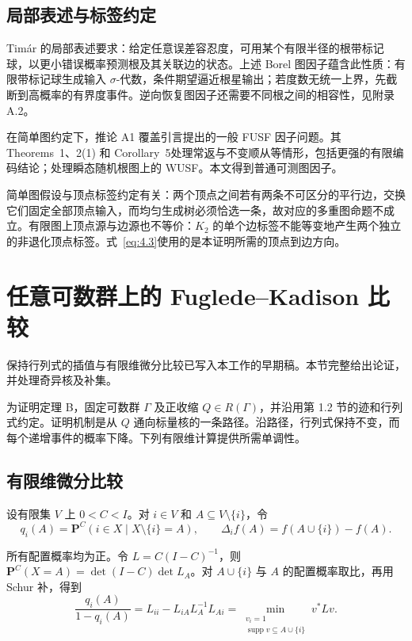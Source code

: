 \documentclass[UTF8,zihao=-4,a4paper]{ctexart}
\numberwithin{equation}{section}
\begin{document}
\subsection{局部表述与标签约定}

Timár 的局部表述要求：给定任意误差容忍度，可用某个有限半径的根带标记球，以更小错误概率预测根及其关联边的状态\cite[\S2]{Tim}。上述 Borel 图因子蕴含此性质：有限带标记球生成输入 $\sigma$-代数，条件期望逼近根星输出；若度数无统一上界，先截断到高概率的有界度事件。逆向恢复图因子还需要不同根之间的相容性，见附录 A.2。

在简单图约定下，推论 A1 覆盖\cite{Tim}引言提出的一般 FUSF 因子问题。其 Theorems~1、2(1) 和 Corollary~5处理常返与不变顺从等情形，包括更强的有限编码结论；\cite[Theorem~1.4]{ARS}处理瞬态随机根图上的 WUSF。本文得到普通可测图因子。

简单图假设与顶点标签约定有关：两个顶点之间若有两条不可区分的平行边，交换它们固定全部顶点输入，而均匀生成树必须恰选一条，故对应的多重图命题不成立。有限图上顶点源与边源也不等价：$K_2$ 的单个边标签不能等变地产生两个独立的非退化顶点标签。式~\eqref{eq:4.3}使用的是本证明所需的顶点到边方向。


\section{任意可数群上的 Fuglede--Kadison 比较}
保持行列式的插值与有限维微分比较已写入本工作的早期稿\cite[第2--3节]{FK26}。本节完整给出论证，并处理奇异核及补集。

为证明定理 B，固定可数群 \(\Gamma\) 及正收缩 \(Q\in R(\Gamma)\)，并沿用第 1.2 节的迹和行列式约定。证明机制是从 \(Q\) 通向标量核的一条路径。沿路径，行列式保持不变，而每个递增事件的概率下降。下列有限维计算提供所需单调性。

\subsection{有限维微分比较}

设有限集 \(V\) 上 \(0<C<I\)。对 \(i\in V\) 和 \(A\subseteq V\setminus\{i\}\)，令
\[
q_i(A)=\mathbf P^C(i\in X\mid X\setminus\{i\}=A),\qquad
\Delta_i f(A)=f(A\cup\{i\})-f(A).
\]

所有配置概率均为正。令 \(L=C(I-C)^{-1}\)，则 \(\mathbf P^C(X=A)=\det(I-C)\det L_A\)。对 \(A\cup\{i\}\) 与 \(A\) 的配置概率取比，再用 Schur 补，得到
\[
\frac{q_i(A)}{1-q_i(A)}
=L_{ii}-L_{iA}L_A^{-1}L_{Ai}
=\min_{\substack{v_i=1\\\operatorname{supp}v\subseteq A\cup\{i\}}}v^*Lv.
\tag{5.1}\label{eq:5.1}
\]
\end{document}
